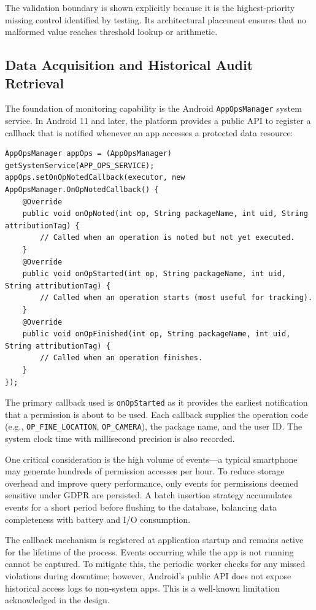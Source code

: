 The validation boundary is shown explicitly because it is the highest-priority missing control identified by testing. Its architectural placement ensures that no malformed value reaches threshold lookup or arithmetic.

\subsection{Data Acquisition and Historical Audit Retrieval}

The foundation of monitoring capability is the Android \texttt{AppOpsManager} system service. In Android 11 and later, the platform provides a public API to register a callback that is notified whenever an app accesses a protected data resource:

\begin{lstlisting}[caption=Registering the permission callback]
AppOpsManager appOps = (AppOpsManager) getSystemService(APP_OPS_SERVICE);
appOps.setOnOpNotedCallback(executor, new AppOpsManager.OnOpNotedCallback() {
    @Override
    public void onOpNoted(int op, String packageName, int uid, String attributionTag) {
        // Called when an operation is noted but not yet executed.
    }
    @Override
    public void onOpStarted(int op, String packageName, int uid, String attributionTag) {
        // Called when an operation starts (most useful for tracking).
    }
    @Override
    public void onOpFinished(int op, String packageName, int uid, String attributionTag) {
        // Called when an operation finishes.
    }
});
\end{lstlisting}

The primary callback used is \texttt{onOpStarted} as it provides the earliest notification that a permission is about to be used. Each callback supplies the operation code (e.g., \texttt{OP\_FINE\_LOCATION}, \texttt{OP\_CAMERA}), the package name, and the user ID. The system clock time with millisecond precision is also recorded.

One critical consideration is the high volume of events—a typical smartphone may generate hundreds of permission accesses per hour. To reduce storage overhead and improve query performance, only events for permissions deemed sensitive under GDPR are persisted. A batch insertion strategy accumulates events for a short period before flushing to the database, balancing data completeness with battery and I/O consumption.

The callback mechanism is registered at application startup and remains active for the lifetime of the process. Events occurring while the app is not running cannot be captured. To mitigate this, the periodic worker checks for any missed violations during downtime; however, Android's public API does not expose historical access logs to non-system apps. This is a well-known limitation acknowledged in the design.


